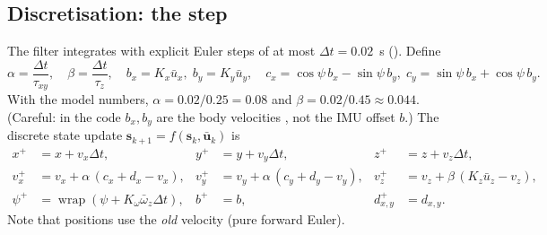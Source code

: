 \subsection{Discretisation: the step }

The filter integrates with explicit Euler steps of at most $\Delta t = 0.02$~s (). Define
\begin{equation}
  \alpha = \frac{\Delta t}{\tau_{xy}}, \quad \beta = \frac{\Delta t}{\tau_z}, \quad
  b_x = K_x\bar u_x,\; b_y = K_y\bar u_y,\quad
  c_x = \cos\psi\,b_x - \sin\psi\,b_y,\; c_y = \sin\psi\,b_x + \cos\psi\,b_y .
\end{equation}
With the model numbers, $\alpha = 0.02/0.25 = 0.08$ and $\beta = 0.02/0.45 \approx 0.044$. (Careful: in the code $b_x,b_y$
are the body velocities , not the IMU offset $b$.) The discrete state update $\mathbf s_{k+1} = f(\mathbf s_k,\bar{\mathbf u}_k)$ is
\begin{equation}
\begin{aligned}
  x^+ &= x + v_x\Delta t, & y^+ &= y + v_y\Delta t, & z^+ &= z + v_z\Delta t,\\
  v_x^+ &= v_x + \alpha\,(c_x + d_x - v_x), & v_y^+ &= v_y + \alpha\,(c_y + d_y - v_y), & v_z^+ &= v_z + \beta\,(K_z\bar u_z - v_z),\\
  \psi^+ &= \operatorname{wrap}(\psi + K_\omega\bar\omega_z\Delta t), & b^+ &= b, & d_{x,y}^+ &= d_{x,y}.
\end{aligned}
\end{equation}
Note that positions use the \emph{old} velocity (pure forward Euler).

